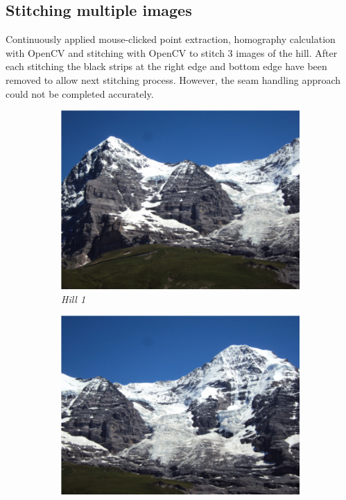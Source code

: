 \documentclass[11pt, a4paper]{article}
\begin{document}
\subsection{Stitching multiple images}
Continuously applied mouse-clicked point extraction, homography calculation with OpenCV and stitching with OpenCV to stitch 3 images of the hill. After each stitching the black strips at the right edge and bottom edge have been removed to allow next stitching process. However, the seam handling approach could not be completed accurately.
\begin{figure}[H]
	\centering
	\begin{subfigure}[b]{0.3\textwidth}
		\centering
		\includegraphics[width=\textwidth]{./images/hill/1.jpg}
		\caption{{\small \textit{Hill 1}}}
		\label{fig:h1}
	\end{subfigure}
	\hfill
	\begin{subfigure}[b]{0.3\textwidth}
		\centering
		\includegraphics[width=\textwidth]{./images/hill/2.jpg}

\end{subfigure}
\end{figure}
\end{document}
